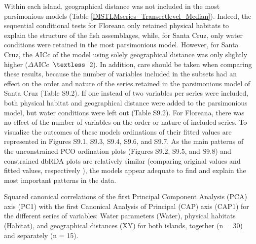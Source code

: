 \documentclass[jmse,article,accept,moreauthors,pdftex]{Definitions/mdpi}
\begin{document}
Within each island, geographical distance was not included in the most parsimonious models (Table \ref{DISTLMseries_Transectlevel_Median}). Indeed, the sequential conditional tests for Floreana only retained physical habitats to explain the structure of the fish assemblages, while, for Santa Cruz, only water conditions were retained in the most parsimonious model. However, for Santa Cruz, the AICc of the model using solely geographical distance was only slightly higher (\mbox{$\Delta$AICc $\textless$ 2}). In addition, care should be taken when comparing these results, because the number of variables included in the subsets had an effect on the order and nature of the series retained in the parsimonious model of Santa Cruz (Table S9.2). If one instead of two variables per series were included, both physical habitat and geographical distance were added to the parsimonious model, but water conditions were left out (Table S9.2). For Floreana, there was no effect of the number of variables on the order or nature of included series. To visualize the outcomes of these models ordinations of their fitted values are represented in Figures S9.1, S9.3, S9.4, S9.6, and S9.7. As the main patterns of the unconstrained PCO ordination plots (Figures S9.2, S9.5, and S9.8) and constrained dbRDA plots are relatively similar ({comparing original values and fitted values, respectively} %
 \citep{Anderson2008PERMANOVA+Methods}), the models appear adequate to find and explain the most important patterns in the data. 


%
\begin{specialtable}[H]
\caption{Squared canonical correlations of the first Principal Component Analysis (PCA) axis (PC1) with the first Canonical Analysis of Principal (CAP) axis (CAP1) for the different series of variables: Water parameters (Water), physical habitats (Habitat), and geographical distances (XY) for both islands, together (n = 30) and separately (n = 15).}
\label{can_correl_CAP_Transectlevel_Median}
\end{specialtable}\unskip
\renewcommand{\arraystretch}{1}
\end{document}
